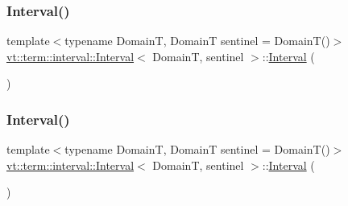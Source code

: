 \subsubsection{\texorpdfstring{Interval()}{Interval()}\hspace{0.1cm}{\footnotesize\ttfamily [1/5]}}
{\footnotesize\ttfamily template$<$typename DomainT, DomainT sentinel = Domain\+T()$>$ \\
\hyperlink{structvt_1_1term_1_1interval_1_1_interval}{vt\+::term\+::interval\+::\+Interval}$<$ DomainT, sentinel $>$\+::\hyperlink{structvt_1_1term_1_1interval_1_1_interval}{Interval} (\begin{DoxyParamCaption}{ }\end{DoxyParamCaption})\hspace{0.3cm}{\ttfamily [default]}}

\mbox{\label{structvt_1_1term_1_1interval_1_1_interval_a75b627acf7c30e4bb48b49ea323842f3}} 
\subsubsection{\texorpdfstring{Interval()}{Interval()}\hspace{0.1cm}{\footnotesize\ttfamily [2/5]}}
{\footnotesize\ttfamily template$<$typename DomainT, DomainT sentinel = Domain\+T()$>$ \\
\hyperlink{structvt_1_1term_1_1interval_1_1_interval}{vt\+::term\+::interval\+::\+Interval}$<$ DomainT, sentinel $>$\+::\hyperlink{structvt_1_1term_1_1interval_1_1_interval}{Interval} (\begin{DoxyParamCaption}\item[{\hyperlink{structvt_1_1term_1_1interval_1_1_interval}{Interval}$<$ DomainT, sentinel $>$ const \&}]{ }\end{DoxyParamCaption})\hspace{0.3cm}{\ttfamily [default]}}

\mbox{\label{structvt_1_1term_1_1interval_1_1_interval_acf0d2f1a988e5afff0a9414ff2340f09}} 
